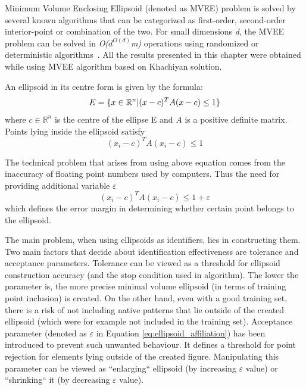 Minimum Volume Enclosing Ellipsoid (denoted as MVEE) problem is solved by several known algorithms that can be categorized as first-order, second-order interior-point or combination of the two. For small dimensions \textit{d}, the MVEE problem can be solved in \textit{O($d^{O(d)}$m)} operations using randomized or deterministic algorithms~\cite{MVEEMichaelTodd2005}. All the results presented in this chapter were obtained while using MVEE algorithm based on Khachiyan solution.

An ellipsoid in its centre form is given by the formula:
\vspace{-6pt} 
\[ 
\vspace{-3pt}
E = \{x \in \mathbb{R}^{n} | (x - c)^{T}A(x-c) \le 1\} 
\vspace{-3pt}
\] 
where $c \in \mathbb{R}^{n}$ is the centre of the ellipse E and $ A $ is a positive definite matrix. Points lying inside the ellipsoid satisfy 
\begin{equation}(x_{i} - c)^{T}A(x_{i} - c) \le 1\end{equation} 

The technical problem that arises from using above equation comes from the inaccuracy of floating point numbers used by computers. Thus the need for providing additional variable $\varepsilon$
\begin{equation}\label{eq:ellipsoid_affiliation}(x_{i} - c)^{T}A(x_{i} - c) \le 1 + \varepsilon\end{equation} 
which defines the error margin in determining whether certain point belongs to the ellipsoid.

The main problem, when using ellipsoids as identifiers, lies in constructing them. Two main factors that decide about identification effectiveness are tolerance and acceptance parameters. Tolerance can be viewed as a threshold for ellipsoid construction accuracy (and the stop condition used in algorithm). The lower the parameter is, the more precise minimal volume ellipsoid (in terms of training point inclusion) is created. On the other hand, even with a good training set, there is a risk of not including native patterns that lie outside of the created ellipsoid (which were for example not included in the training set). Acceptance parameter (denoted as $\varepsilon$ in Equation \ref{eq:ellipsoid_affiliation}) has been introduced to prevent such unwanted behaviour. It defines a threshold for point rejection for elements lying outside of the created figure. Manipulating this parameter can be viewed as ``enlarging`` ellipsoid (by increasing $\varepsilon$ value) or ``shrinking`` it (by decreasing $\varepsilon$ value).


